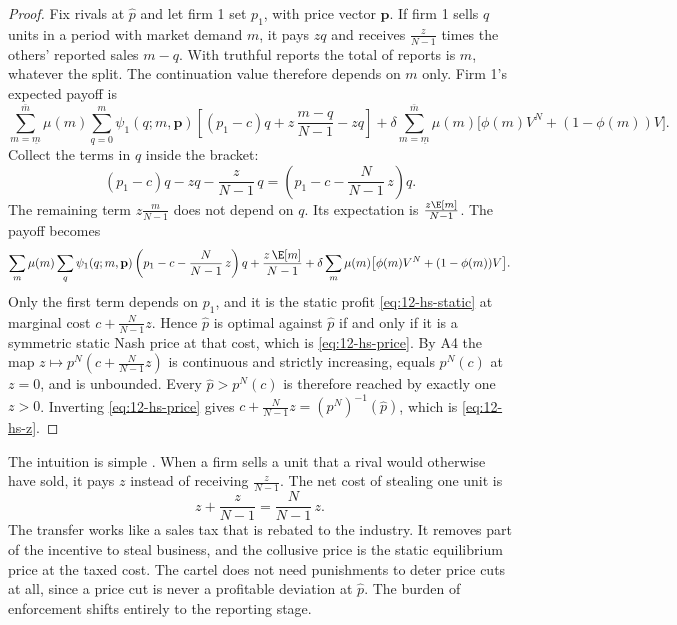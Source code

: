 \begin{proof}
Fix rivals at $\hat p$ and let firm 1 set $p_1$, with price vector $\mathbf{p}$. If firm 1 sells $q$ units in a
period with market demand $m$, it pays $zq$ and receives $\frac{z}{N-1}$ times the others' reported sales $m - q$.
With truthful reports the total of reports is $m$, whatever the split. The continuation value therefore depends on
$m$ only. Firm 1's expected payoff is \citep[equation (9)]{HarringtonSkrzypacz2011}
\begin{equation*}
  \sum_{m=\underline m}^{\bar m}\mu(m)\sum_{q=0}^{m}\psi_1(q; m, \mathbf{p})
  \left[(p_1 - c)q + z\,\frac{m - q}{N-1} - zq\right]
  + \delta\sum_{m=\underline m}^{\bar m}\mu(m)\bigl[\phi(m)V^N + (1 - \phi(m))V\bigr] .
\end{equation*}
Collect the terms in $q$ inside the bracket:
\begin{equation*}
  (p_1 - c)q - zq - \frac{z}{N-1}\,q = \left(p_1 - c - \frac{N}{N-1}\,z\right)q .
\end{equation*}
The remaining term $z\frac{m}{N-1}$ does not depend on $q$. Its expectation is $\frac{z\E[m]}{N-1}$. The payoff
becomes
\begin{equation*}
  \sum_{m}\mu(m)\sum_{q}\psi_1(q; m, \mathbf{p})\left(p_1 - c - \frac{N}{N-1}\,z\right)q
  + \frac{z\,\E[m]}{N-1}
  + \delta\sum_{m}\mu(m)\bigl[\phi(m)V^N + (1 - \phi(m))V\bigr] .
\end{equation*}
Only the first term depends on $p_1$, and it is the static profit \eqref{eq:12-hs-static} at marginal cost
$c + \frac{N}{N-1}z$. Hence $\hat p$ is optimal against $\hat p$ if and only if it is a symmetric static Nash price
at that cost, which is \eqref{eq:12-hs-price}. By A4 the map $z \mapsto p^N(c + \frac{N}{N-1}z)$ is continuous and
strictly increasing, equals $p^N(c)$ at $z = 0$, and is unbounded. Every $\hat p > p^N(c)$ is therefore reached by
exactly one $z > 0$. Inverting \eqref{eq:12-hs-price} gives $c + \frac{N}{N-1}z = (p^N)^{-1}(\hat p)$, which is
\eqref{eq:12-hs-z}.
\end{proof}

The intuition is simple \citep[p.~2435]{HarringtonSkrzypacz2011}. When a firm sells a unit that a rival would
otherwise have sold, it pays $z$ instead of receiving $\frac{z}{N-1}$. The net cost of stealing one unit is
\begin{equation*}
  z + \frac{z}{N-1} = \frac{N}{N-1}\,z .
\end{equation*}
The transfer works like a sales tax that is rebated to the industry. It removes part of the incentive to steal
business, and the collusive price is the static equilibrium price at the taxed cost. The cartel does not need
punishments to deter price cuts at all, since a price cut is never a profitable deviation at $\hat p$. The burden of enforcement shifts entirely to the reporting stage.

